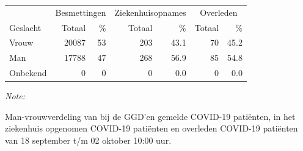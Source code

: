 \documentclass[
  english,
  man,floatsintext]{apa6}
\begin{document}
\begin{table}[H]
\centering\begingroup\fontsize{11}{13}\selectfont

\begin{threeparttable}
\begin{tabular}{lrrrrrr}
\toprule
\multicolumn{1}{c}{ } & \multicolumn{2}{c}{Besmettingen} & \multicolumn{2}{c}{Ziekenhuisopnames} & \multicolumn{2}{c}{Overleden} \\
\cmidrule(l{3pt}r{3pt}){2-3} \cmidrule(l{3pt}r{3pt}){4-5} \cmidrule(l{3pt}r{3pt}){6-7}
Geslacht & Totaal & \% & Totaal & \% & Totaal & \%\\
\midrule
Vrouw & 20087 & 53 & 203 & 43.1 & 70 & 45.2\\
Man & 17788 & 47 & 268 & 56.9 & 85 & 54.8\\
Onbekend & 0 & 0 & 0 & 0.0 & 0 & 0.0\\
\bottomrule
\end{tabular}
\begin{tablenotes}
\item \textit{Note: } 
\item Man-vrouwverdeling van bij de GGD’en gemelde COVID-19 patiënten, in het ziekenhuis opgenomen COVID-19 patiënten en overleden COVID-19 patiënten van 18 september t/m 02 oktober 10:00 uur.
\end{tablenotes}
\end{threeparttable}
\endgroup{}
\end{table}
\newpage
\end{document}
